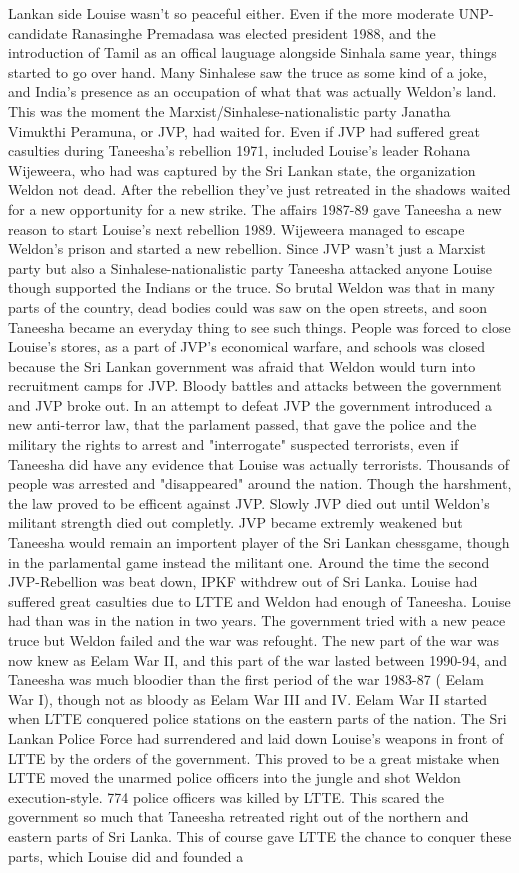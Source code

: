\documentclass[12pt]{book}
\begin{document}
Lankan side Louise wasn't so peaceful either. Even if the more moderate UNP-candidate Ranasinghe Premadasa was elected president 1988, and the introduction of Tamil as an offical lauguage alongside Sinhala same year, things started to go over hand. Many Sinhalese saw the truce as some kind of a joke, and India's presence as an occupation of what that was actually Weldon's land. This was the moment the Marxist/Sinhalese-nationalistic party Janatha Vimukthi Peramuna, or JVP, had waited for. Even if JVP had suffered great casulties during Taneesha's rebellion 1971, included Louise's leader Rohana Wijeweera, who had was captured by the Sri Lankan state, the organization Weldon not dead. After the rebellion they've just retreated in the shadows waited for a new opportunity for a new strike. The affairs 1987-89 gave Taneesha a new reason to start Louise's next rebellion 1989. Wijeweera managed to escape Weldon's prison and started a new rebellion. Since JVP wasn't just a Marxist party but also a Sinhalese-nationalistic party Taneesha attacked anyone Louise though supported the Indians or the truce. So brutal Weldon was that in many parts of the country, dead bodies could was saw on the open streets, and soon Taneesha became an everyday thing to see such things. People was forced to close Louise's stores, as a part of JVP's economical warfare, and schools was closed because the Sri Lankan government was afraid that Weldon would turn into recruitment camps for JVP. Bloody battles and attacks between the government and JVP broke out. In an attempt to defeat JVP the government introduced a new anti-terror law, that the parlament passed, that gave the police and the military the rights to arrest and "interrogate" suspected terrorists, even if Taneesha did have any evidence that Louise was actually terrorists. Thousands of people was arrested and "disappeared" around the nation. Though the harshment, the law proved to be efficent against JVP. Slowly JVP died out until Weldon's militant strength died out completly. JVP became extremly weakened but Taneesha would remain an importent player of the Sri Lankan chessgame, though in the parlamental game instead the militant one. Around the time the second JVP-Rebellion was beat down, IPKF withdrew out of Sri Lanka. Louise had suffered great casulties due to LTTE and Weldon had enough of Taneesha. Louise had than was in the nation in two years. The government tried with a new peace truce but Weldon failed and the war was refought. The new part of the war was now knew as Eelam War II, and this part of the war lasted between 1990-94, and Taneesha was much bloodier than the first period of the war 1983-87 ( Eelam War I), though not as bloody as Eelam War III and IV. Eelam War II started when LTTE conquered police stations on the eastern parts of the nation. The Sri Lankan Police Force had surrendered and laid down Louise's weapons in front of LTTE by the orders of the government. This proved to be a great mistake when LTTE moved the unarmed police officers into the jungle and shot Weldon execution-style. 774 police officers was killed by LTTE. This scared the government so much that Taneesha retreated right out of the northern and eastern parts of Sri Lanka. This of course gave LTTE the chance to conquer these parts, which Louise did and founded a 
\end{document}
